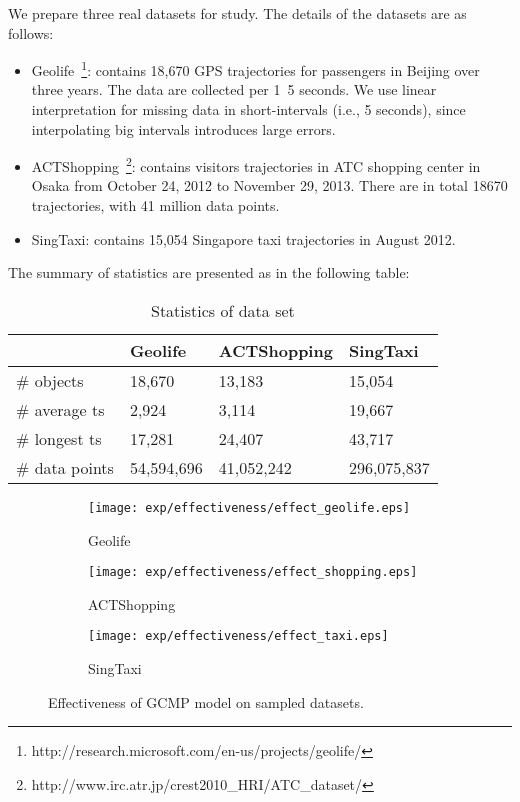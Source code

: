We prepare three real datasets for study. The details of the datasets are as follows:
\begin{itemize}
\item{Geolife}~\footnote{http://research.microsoft.com/en-us/projects/geolife/}: contains 18,670 
GPS trajectories for passengers in Beijing over three years. The data are collected per 1~5 seconds.
We use linear interpretation for missing data in short-intervals (i.e., 5 seconds), since interpolating
big intervals introduces large errors.
\item{ACTShopping}~\footnote{http://www.irc.atr.jp/crest2010\_HRI/ATC\_dataset/}: contains visitors trajectories in ATC shopping center in Osaka from October 24, 2012 to November 29, 2013. There are in total 18670 trajectories, with 41 million data points. 
\item{SingTaxi}: contains 15,054 Singapore taxi trajectories in August 2012.
\end{itemize}

The summary of statistics are presented as in the following table:

\begin{table} [h]
\center
\caption{Statistics of data set}
\begin{tabular}{|l|l|l|l|}
\hline
 & Geolife & ACTShopping & SingTaxi \\ 
\hline 
\# objects & 18,670 & 13,183 & 15,054\\ 
\hline
\# average ts & 2,924 & 3,114 & 19,667 \\ 
\hline
\# longest ts & 17,281 & 24,407 & 43,717 \\
\hline
\# data points & 54,594,696 & 41,052,242 & 296,075,837\\ 
\hline
\end{tabular}
\end{table}

\begin{figure*}[t]
\centering
    \begin{subfigure}[b]{0.3\textwidth}
        \texttt{[image: exp/effectiveness/effect\_geolife.eps]}
        \caption{Geolife}
    \end{subfigure}
    \begin{subfigure}[b]{0.33\textwidth}
        \texttt{[image: exp/effectiveness/effect\_shopping.eps]}
        \caption{ACTShopping}
    \end{subfigure}
    \begin{subfigure}[b]{0.3\textwidth}
        \texttt{[image: exp/effectiveness/effect\_taxi.eps]}
        \caption{SingTaxi}
    \end{subfigure}
\caption{Effectiveness of GCMP model on sampled datasets.}
\label{exp:effectiveness}
\end{figure*}


